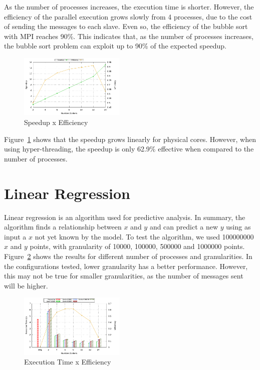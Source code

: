 \documentclass[10pt, twocolumn]{report}
\begin{document}
As the number of processes increases, the execution time is shorter. However, the efficiency of the parallel execution grows slowly from 4 processes, due to the cost of sending the messages to each slave. Even so, the efficiency of the bubble sort with MPI reaches 90\%. This indicates that, as the number of processes increases, the bubble sort problem can exploit up to 90\% of the expected speedup.

\begin{figure}[ht]
	\centering
	\includegraphics[width=0.45\textwidth]{../logs/scripts/bubble-sort-speedup-efficiency.pdf}
	\caption{Speedup x Efficiency}
	\label{fig:bubble-sort-speedup-efficiency}
\end{figure}

Figure~\ref{fig:bubble-sort-speedup-efficiency} shows that the speedup grows linearly for physical cores. However, when using hyper-threading, the speedup is only 62.9\% effective when compared to the number of processes.

\section {Linear Regression}
Linear regression is an algorithm used for predictive analysis. In summary, the algorithm finds a relationship between $x$ and $y$ and can predict a new $y$ using as input a $x$ not yet known by the model. To test the algorithm, we used 100000000 $x$ and $y$ points, with granularity of 10000, 100000, 500000 and 1000000 points. Figure~\ref{fig:linear-regression-time} shows the results for different number of processes and granularities. In the configurations tested, lower granularity has a better performance. However, this may not be true for smaller granularities, as the number of messages sent will be higher.

\begin{figure}[ht]
	\centering
	\includegraphics[width=0.45\textwidth]{../logs/scripts/linear-regression-time.pdf}
	\caption{Execution Time x Efficiency}
	\label{fig:linear-regression-time}
\end{figure}
\end{document}
